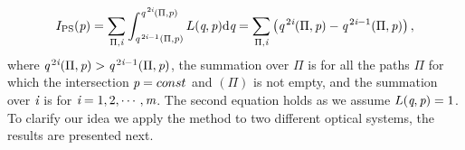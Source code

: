 \begin{equation}
I_{\textrm{PS}}(\textit{p}) = \sum_{\Pi, \textit{i} }\int_{\textit{q}^{\,2\textit{i}-1}(\Pi, \textit{p})}^{\textit{q}^{\,2\textit{i}}( \Pi, \textit{p})}L(\textit{q}, \textit{p})\textrm{d}\textit{q} =
 \sum_{\Pi, \textit{i}}\big(\textit{q}^{\,2\textit{i}}(\Pi, \textit{p})-
\textit{q}^{\,2\textit{i}-1}( \Pi, \textit{p})\big)\,,
\label{eq:Ips}
\end{equation}
where $\textit{q}^{\,2\textit{i}}( \Pi, \textit{p})>\textit{q}^{\,2\textit{i}-1}( \Pi, \textit{p})$, the summation over $\Pi$ is for all the paths $\Pi$ for which the intersection $\textit{p} = const$ and $(\Pi)$ is not empty, and the summation over $\textit{i}$ is for $\textit{i} = 1,2, \cdots, \textit{m}$. The second equation holds as we assume $L(\textit{q}, \textit{p})=1$.\\ \indent
To clarify our idea we apply the method to two different optical systems, the results are presented next.
